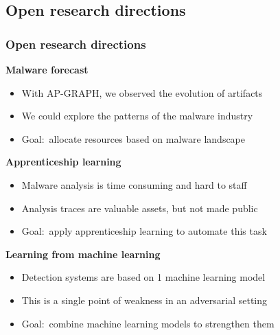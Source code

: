 \subsection{Open research directions}

\begin{frame}
    \frametitle{Open research directions}

    \begin{block}{}
        \centering
        \textbf{Malware forecast}
    \end{block}
    \begin{itemize}
        \item With AP-GRAPH, we observed the evolution of artifacts
        \item We could explore the patterns of the malware industry
        \item Goal:~allocate resources based on malware landscape
    \end{itemize}

    \begin{block}{}
        \centering
        \textbf{Apprenticeship learning}
    \end{block}
    \begin{itemize}
        \item Malware analysis is time consuming and hard to staff
        \item Analysis traces are valuable assets, but not made public
        \item Goal:~apply apprenticeship learning to automate this task
    \end{itemize}

    \begin{block}{}
        \centering
        \textbf{Learning from machine learning}
    \end{block}
    \begin{itemize}
        \item Detection systems are based on 1 machine learning model
        \item This is a single point of weakness in an adversarial setting 
        \item Goal:~combine machine learning models to strengthen them
    \end{itemize}

\end{frame}
